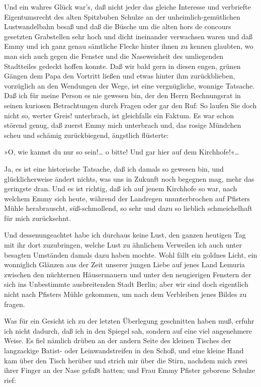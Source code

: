 Und ein wahres Glück war's, daß nicht jeder das gleiche Interesse
und verbriefte Eigentumsrecht des alten Spitzbuben Schulze an der
unheimlich-gemütlichen Lustwandelbahn besaß und daß die Büsche um
die alten hors de concours gesetzten Grabstellen sehr hoch und
dicht ineinander verwachsen waren und daß Emmy und ich ganz genau
sämtliche Flecke hinter ihnen zu kennen glaubten, wo man sich auch
gegen die Fenster und die Naseweisheit des umliegenden Stadtteiles
gedeckt hoffen konnte. Daß wir bald gern in diesen engen, grünen
Gängen dem Papa den Vortritt ließen und etwas hinter ihm
zurückblieben, vorzüglich an den Wendungen der Wege, ist eine
vergnügliche, wonnige Tatsache. Daß ich für meine Person es nie
gewesen bin, der den Herrn Rechnungsrat in seinen kuriosen
Betrachtungen durch Fragen oder gar den Ruf: So laufen Sie doch
nicht so, werter Greis! unterbrach, ist gleichfalls ein Faktum. Es
war schon störend genug, daß zuerst Emmy mich unterbrach und, das
rosige Mündchen scheu und schämig zurückbiegend, ängstlich
flüsterte:

»O, wie kannst du nur so sein!\ldots{} o bitte! Und gar hier auf dem
Kirchhofe!«\ldots{}

Ja, es ist eine historische Tatsache, daß ich damals so gewesen
bin, und glücklicherweise ändert nichts, was uns in Zukunft noch
begegnen mag, mehr das geringste dran. Und es ist richtig, daß ich
auf jenem Kirchhofe so war, nach welchem Emmy sich heute, während
der Landregen ununterbrochen auf Pfisters Mühle herabrauscht,
süß-schmollend, so sehr und dazu so lieblich schmeichelhaft für
mich zurücksehnt.

Und dessenungeachtet habe ich durchaus keine Lust, den ganzen
heutigen Tag mit ihr dort zuzubringen, welche Lust zu ähnlichem
Verweilen ich auch unter besagten Umständen damals dazu haben
mochte. Wohl fällt ein goldnes Licht, ein wonniglich Glänzen aus
der Zeit unserer jungen Liebe auf jenes Land Lemuria zwischen den
nüchternen Häusermauern und unter den neugierigen Fenstern der sich
ins Unbestimmte ausbreitenden Stadt Berlin; aber wir sind doch
eigentlich nicht nach Pfisters Mühle gekommen, um nach dem
Verbleiben jenes Bildes zu fragen.

Was für ein Gesicht ich zu der letzten Überlegung geschnitten haben
muß, erfuhr ich nicht dadurch, daß ich in den Spiegel sah, sondern
auf eine viel angenehmere Weise. Es fiel nämlich drüben an der
andern Seite des kleinen Tisches der langzackige Batist- oder
Leinwandstreifen in den Schoß, und eine kleine Hand kam über den
Tisch herüber und strich mir über die Stirn, nachdem mich zwei
ihrer Finger an der Nase gefaßt hatten; und Frau Emmy Pfister
geborene Schulze rief:

